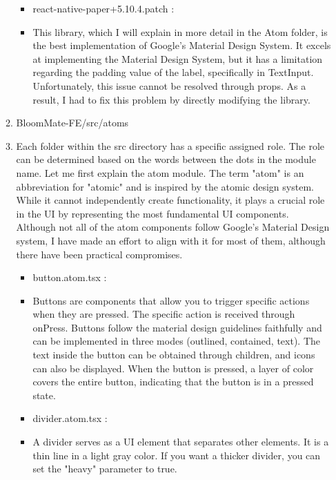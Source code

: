 \documentclass[conference, a4paper]{IEEEtran}
\begin{document}
\begin{enumerate}
\begin{enumerate}
\begin{itemize}
        \item react-native-paper+5.10.4.patch :
        \item[] This library, which I will explain in more detail in the Atom folder, is the best implementation of Google's Material Design System. It excels at implementing the Material Design System, but it has a limitation regarding the padding value of the label, specifically in TextInput. Unfortunately, this issue cannot be resolved through props. As a result, I had to fix this problem by directly modifying the library.
    \end{itemize}

    \item BloomMate-FE/src/atoms
    \item[] Each folder within the src directory has a specific assigned role. The role can be determined based on the words between the dots in the module name. Let me first explain the atom module. The term "atom" is an abbreviation for "atomic" and is inspired by the atomic design system. While it cannot independently create functionality, it plays a crucial role in the UI by representing the most fundamental UI components. Although not all of the atom components follow Google's Material Design system, I have made an effort to align with it for most of them, although there have been practical compromises.
    \begin{itemize}
        \item button.atom.tsx : 
        \item[]  Buttons are components that allow you to trigger specific actions when they are pressed. The specific action is received through onPress. Buttons follow the material design guidelines faithfully and can be implemented in three modes (outlined, contained, text). The text inside the button can be obtained through children, and icons can also be displayed. When the button is pressed, a layer of color covers the entire button, indicating that the button is in a pressed state.\\

        \item divider.atom.tsx :
        \item[] A divider serves as a UI element that separates other elements. It is a thin line in a light gray color. If you want a thicker divider, you can set the "heavy" parameter to true. \\


\end{itemize}
\end{enumerate}
\end{enumerate}
\end{document}
